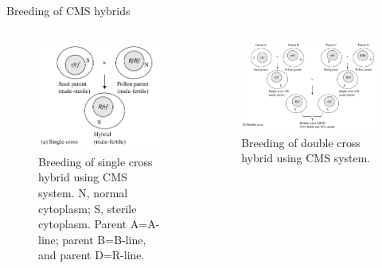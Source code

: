 \documentclass[11pt,ignorenonframetext,aspectratio=169]{beamer}
\newif\ifbibliography
\newcommand{\bcolumns}{\begin{columns}[T, onlytextwidth]}
\newcommand{\ecolumns}{\end{columns}}
\begin{document}
\begin{frame}{Breeding of CMS hybrids}
\protect\hypertarget{breeding-of-cms-hybrids}{}
\bcolumns
{}
\begin{figure}

{\centering \includegraphics[width=0.5\linewidth]{./images/cms_hybrids_single} 

}

\caption{Breeding of single cross hybrid using CMS system. N, normal cytoplasm; S, sterile cytoplasm. Parent A=A-line; parent B=B-line, and parent D=R-line.}\label{fig:cms-hybrids-single}
\end{figure}

\begin{figure}

{\centering \includegraphics[width=0.5\linewidth]{./images/cms_hybrids_double} 

}

\caption{Breeding of double cross hybrid using CMS system.}\label{fig:cms-hybrids-double}
\end{figure}

\ecolumns
\end{frame}

          \begin{frame}[allowframebreaks]{}
    \bibliographytrue
    
    \end{frame}
  
\end{document}
